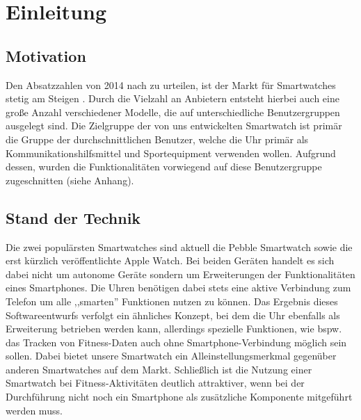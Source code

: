 \chapter{Einleitung}

\section{Motivation}
Den Absatzzahlen von 2014 nach zu urteilen, ist der Markt für Smartwatches stetig am Steigen \cite{absatzzahlen}. Durch die Vielzahl an Anbietern entsteht hierbei auch eine große Anzahl verschiedener Modelle, die auf unterschiedliche Benutzergruppen ausgelegt sind. Die Zielgruppe der von uns entwickelten Smartwatch ist primär die Gruppe der durchschnittlichen Benutzer, welche die Uhr primär als Kommunikationshilfsmittel und Sportequipment verwenden wollen. Aufgrund dessen, wurden die Funktionalitäten vorwiegend auf diese Benutzergruppe zugeschnitten (siehe Anhang).

\section{Stand der Technik}
Die zwei populärsten Smartwatches sind aktuell die Pebble Smartwatch sowie die erst kürzlich veröffentlichte Apple Watch. Bei beiden Geräten handelt es sich dabei nicht um autonome Geräte sondern um Erweiterungen der Funktionalitäten eines Smartphones. Die Uhren benötigen dabei stets eine aktive Verbindung zum Telefon um alle ,,smarten'' Funktionen nutzen zu können. Das Ergebnis dieses Softwareentwurfs verfolgt ein ähnliches Konzept, bei dem die Uhr ebenfalls als Erweiterung betrieben werden kann, allerdings spezielle Funktionen, wie bspw. das Tracken von Fitness-Daten auch ohne Smartphone-Verbindung möglich sein sollen. Dabei bietet unsere Smartwatch ein Alleinstellungsmerkmal gegenüber anderen Smartwatches auf dem Markt. Schließlich ist die Nutzung einer Smartwatch bei Fitness-Aktivitäten deutlich attraktiver, wenn bei der Durchführung nicht noch ein Smartphone als zusätzliche Komponente mitgeführt werden muss.


